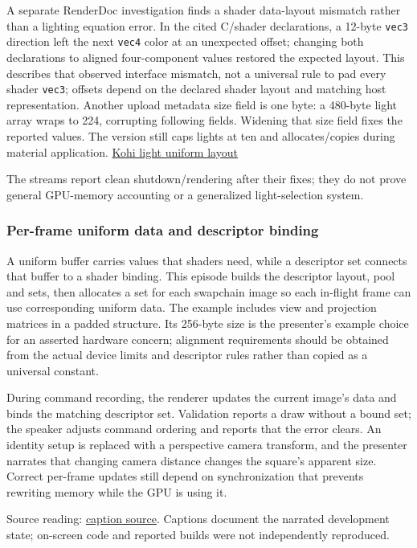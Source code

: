 A separate RenderDoc investigation finds a shader data-layout mismatch rather than a lighting equation error. In the cited C/shader declarations, a 12-byte \texttt{vec3} direction left the next \texttt{vec4} color at an unexpected offset; changing both declarations to aligned four-component values restored the expected layout. This describes that observed interface mismatch, not a universal rule to pad every shader \texttt{vec3}; offsets depend on the declared shader layout and matching host representation. Another upload metadata size field is one byte: a 480-byte light array wraps to 224, corrupting following fields. Widening that size field fixes the reported values. The version still caps lights at ten and allocates/copies during material application. \href{https://www.youtube.com/watch?v=nhEHfkiarV8}{Kohi light uniform layout}

The streams report clean shutdown/rendering after their fixes; they do not prove general GPU-memory accounting or a generalized light-selection system.

\subsubsection{Per-frame uniform data and descriptor binding}\label{06-engine-ii-ch026-per-frame-uniform-data-and-descriptor-binding}

A uniform buffer carries values that shaders need, while a descriptor set connects that buffer to a shader binding. This episode builds the descriptor layout, pool and sets, then allocates a set for each swapchain image so each in-flight frame can use corresponding uniform data. The example includes view and projection matrices in a padded structure. Its 256-byte size is the presenter's example choice for an asserted hardware concern; alignment requirements should be obtained from the actual device limits and descriptor rules rather than copied as a universal constant.

During command recording, the renderer updates the current image's data and binds the matching descriptor set. Validation reports a draw without a bound set; the speaker adjusts command ordering and reports that the error clears. An identity setup is replaced with a perspective camera transform, and the presenter narrates that changing camera distance changes the square's apparent size. Correct per-frame updates still depend on synchronization that prevents rewriting memory while the GPU is using it.

Source reading: \href{https://www.youtube.com/watch?v=yc40ixalLtU}{caption source}. Captions document the narrated development state; on-screen code and reported builds were not independently reproduced.

